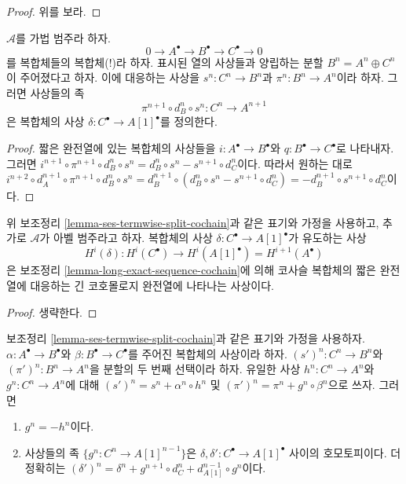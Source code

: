 \begin{proof}
위를 보라.
\end{proof}

\begin{lemma}
\label{lemma-ses-termwise-split-cochain}
$\mathcal{A}$를 가법 범주라 하자.
$$
0 \to A^\bullet \to B^\bullet \to C^\bullet \to 0
$$
를 복합체들의 복합체(!)라 하자.
표시된 열의 사상들과 양립하는 분할 $B^n = A^n \oplus C^n$이
주어졌다고 하자. 이에 대응하는 사상을
$s^n : C^n \to B^n$과 $\pi^n : B^n \to A^n$이라 하자.
그러면 사상들의 족
$$
\pi^{n + 1} \circ d_B^n \circ s^n
:
C^n \to A^{n + 1}
$$
은 복합체의 사상 $\delta : C^\bullet \to A[1]^\bullet$를 정의한다.
\end{lemma}

\begin{proof}
짧은 완전열에 있는 복합체의 사상들을
$i : A^\bullet \to B^\bullet$와 $q : B^\bullet \to C^\bullet$로
나타내자. 그러면
$i^{n + 1} \circ \pi^{n + 1} \circ d_B^n \circ s^n =
d_B^n \circ s^n - s^{n + 1} \circ d_C^n$이다. 따라서 원하는 대로
$i^{n + 2} \circ d_A^{n + 1} \circ \pi^{n + 1} \circ d_B^n \circ s^n =
d_B^{n + 1} \circ (d_B^n \circ s^n - s^{n + 1} \circ d_C^n) =
- d_B^{n + 1} \circ s^{n + 1} \circ d_C^n$이다.
\end{proof}

\begin{lemma}
\label{lemma-ses-termwise-split-long-cochain}
위 보조정리 \ref{lemma-ses-termwise-split-cochain}과 같은 표기와 가정을
사용하고, 추가로 $\mathcal{A}$가 아벨 범주라고 하자.
복합체의 사상 $\delta : C^\bullet \to A[1]^\bullet$가 유도하는 사상
$$
H^i(\delta) :
H^i(C^\bullet) \longrightarrow H^i(A[1]^\bullet) = H^{i + 1}(A^\bullet)
$$
은 보조정리 \ref{lemma-long-exact-sequence-cochain}에 의해 코사슬
복합체의 짧은 완전열에 대응하는 긴 코호몰로지 완전열에 나타나는
사상이다.
\end{lemma}

\begin{proof}
생략한다.
\end{proof}

\begin{lemma}
\label{lemma-ses-termwise-split-homotopy-cochain}
보조정리 \ref{lemma-ses-termwise-split-cochain}과 같은 표기와 가정을
사용하자. $\alpha : A^\bullet \to B^\bullet$와
$\beta : B^\bullet \to C^\bullet$를 주어진 복합체의 사상이라 하자.
$(s')^n : C^n \to B^n$와 $(\pi')^n : B^n \to A^n$을 분할의 두 번째
선택이라 하자. 유일한 사상 $h^n : C^n \to A^n$와
$g^n : C^n \to A^n$에 대해
$(s')^n = s^n + \alpha^n \circ h^n$ 및
$(\pi')^n = \pi^n + g^n \circ \beta^n$으로 쓰자. 그러면
\begin{enumerate}
\item $g^n = - h^n$이다.
\item 사상들의 족 $\{g^n : C^n \to A[1]^{n - 1}\}$은
$\delta, \delta' : C^\bullet \to A[1]^\bullet$ 사이의 호모토피이다.
더 정확히는
$(\delta')^n = \delta^n + g^{n + 1} \circ d_C^n + d_{A[1]}^{n - 1} \circ g^n$이다.
\end{enumerate}
\end{lemma}

